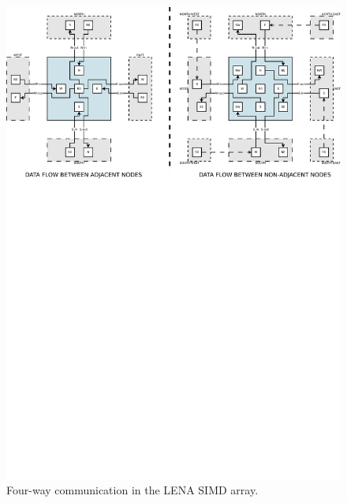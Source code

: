 \begin{figure}[h]
  \centering
  \includegraphics[width=\linewidth,clip,trim=0 18cm 0 0]
                  {fig/fpga/fpga-simd-datacom.pdf}
  \caption[Communication in SIMD array.]{Four-way communication in the \ac{LENA}
    \ac{SIMD} array.}
  \label{fig:fpga-simd-datacom}
\end{figure}
